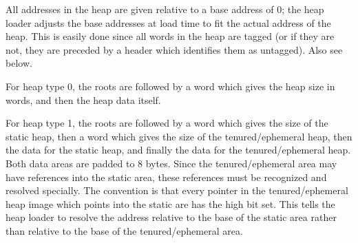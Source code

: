 All addresses in the heap are given relative to a base address of 0; the heap
loader adjusts the base addresses at load time to fit the actual address of
the heap. This is easily done since all words in the heap are tagged (or if
they are not, they are preceded by a header which identifies them as untagged).
Also see below.

For heap type 0, the roots are followed by a word which gives the heap
size in words, and then the heap data itself.

For heap type 1, the roots are followed by a word which gives the size of
the static heap, then a word which gives the size of the tenured/ephemeral
heap, then the data for the static heap, and finally the data for the
tenured/ephemeral heap.  Both data areas are padded to 8 bytes. Since the
tenured/ephemeral area may have references into the static area, these
references must be recognized and resolved specially. The convention is that
every pointer in the tenured/ephemeral heap image which points into the
static are has the high bit set. This tells the heap loader to resolve the
address relative to the base of the static area rather than relative to the
base of the tenured/ephemeral area.


